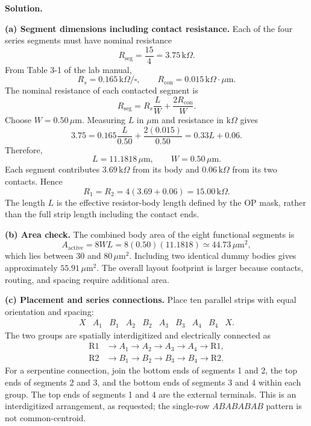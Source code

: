 \documentclass[12pt,letterpaper]{article}
\begin{document}
\begin{enumerate}
\textbf{Solution.}

\textbf{(a) Segment dimensions including contact resistance.}
Each of the four series segments must have nominal resistance
\[
R_{\mathrm{seg}}=\frac{15}{4}=3.75\,\mathrm{k}\Omega.
\]
From Table 3-1 of the lab manual,
\[
R_s=0.165\,\mathrm{k}\Omega/\square,\qquad
R_{\mathrm{con}}=0.015\,\mathrm{k}\Omega\cdot\mu\mathrm{m}.
\]
The nominal resistance of each contacted segment is
\[
R_{\mathrm{seg}}=R_s\frac{L}{W}+\frac{2R_{\mathrm{con}}}{W}.
\]
Choose $W=0.50\,\mu\mathrm{m}$. Measuring $L$ in
$\mu\mathrm{m}$ and resistance in $\mathrm{k}\Omega$ gives
\[
3.75=0.165\frac{L}{0.50}+\frac{2(0.015)}{0.50}
=0.33L+0.06.
\]
Therefore,
\[
\boxed{L=11.1818\,\mu\mathrm{m},\qquad W=0.50\,\mu\mathrm{m}.}
\]
Each segment contributes $3.69\,\mathrm{k}\Omega$ from its body and
$0.06\,\mathrm{k}\Omega$ from its two contacts. Hence
\[
\boxed{R_1=R_2=4(3.69+0.06)=15.00\,\mathrm{k}\Omega.}
\]
The length $L$ is the effective resistor-body length defined by the
OP mask, rather than the full strip length including the contact ends.

\textbf{(b) Area check.}
The combined body area of the eight functional segments is
\[
A_{\mathrm{active}}=8WL
=8(0.50)(11.1818)
\simeq\boxed{44.73\,\mu\mathrm{m}^2},
\]
which lies between $30$ and $80\,\mu\mathrm{m}^2$.
Including two identical dummy bodies gives approximately
$55.91\,\mu\mathrm{m}^2$. The overall layout footprint is larger
because contacts, routing, and spacing require additional area.

\textbf{(c) Placement and series connections.}
Place ten parallel strips with equal orientation and spacing:
\[
\begin{array}{cccccccccc}
X&A_1&B_1&A_2&B_2&A_3&B_3&A_4&B_4&X.
\end{array}
\]
The two groups are spatially interdigitized and electrically connected as
\begin{align*}
\mathrm{R1}&\longrightarrow A_1\longrightarrow A_2
\longrightarrow A_3\longrightarrow A_4\longrightarrow\mathrm{R1},\\
\mathrm{R2}&\longrightarrow B_1\longrightarrow B_2
\longrightarrow B_3\longrightarrow B_4\longrightarrow\mathrm{R2}.
\end{align*}
For a serpentine connection, join the bottom ends of segments 1 and 2,
the top ends of segments 2 and 3, and the bottom ends of segments 3
and 4 within each group. The top ends of segments 1 and 4 are the
external terminals. This is an interdigitized arrangement, as requested;
the single-row $ABABABAB$ pattern is not common-centroid.


\end{enumerate}
\end{document}
